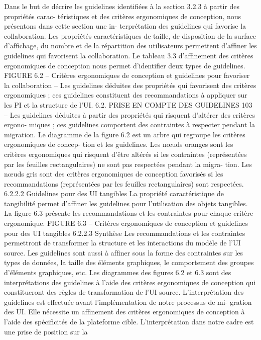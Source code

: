 \documentclass{article}
\begin{document}
Dans le but de décrire les guidelines identiﬁées à la section 3.2.3 à partir des propriétés carac-
téristiques et des critères ergonomiques de conception, nous présentons dans cette section une in-
terprétation des guidelines qui favorise la collaboration. Les propriétés caractéristiques de taille, de
disposition de la surface d’afﬁchage, du nombre et de la répartition des utilisateurs permettent d’afﬁner
les guidelines qui favorisent la collaboration. Le tableau 3.3 d’afﬁnement des critères ergonomiques
de conception nous permet d’identiﬁer deux types de guidelines.
FIGURE 6.2 – Critères ergonomiques de conception et guidelines pour favoriser la collaboration
– Les guidelines déduites des propriétés qui favorisent des critères ergonomiques ; ces guidelines
constituent des recommandations à appliquer sur les PI et la structure de l’UI.
6.2. PRISE EN COMPTE DES GUIDELINES
103
– Les guidelines déduites à partir des propriétés qui risquent d’altérer des critères ergono-
miques ; ces guidelines comportent des contraintes à respecter pendant la migration.
Le diagramme de la ﬁgure 6.2 est un arbre qui regroupe les critères ergonomiques de concep-
tion et les guidelines. Les nœuds oranges sont les critères ergonomiques qui risquent d’être altérés si
les contraintes (représentées par les feuilles rectangulaires) ne sont pas respectées pendant la migra-
tion. Les nœuds gris sont des critères ergonomiques de conception favorisés si les recommandations
(représentées par les feuilles rectangulaires) sont respectées.
6.2.2.2
Guidelines pour des UI tangibles
La propriété caractéristique de tangibilité permet d’afﬁner les guidelines pour l’utilisation des
objets tangibles. La ﬁgure 6.3 présente les recommandations et les contraintes pour chaque critère
ergonomique.
FIGURE 6.3 – Critères ergonomiques de conception et guidelines pour des UI tangibles
6.2.2.3
Synthèse
Les recommandations et les contraintes permettront de transformer la structure et les interactions
du modèle de l’UI source.
Les guidelines sont aussi à afﬁner sous la forme des contraintes sur les types de données, la taille
des éléments graphiques, le comportement des groupes d’éléments graphiques, etc.
Les diagrammes des ﬁgures 6.2 et 6.3 sont des interprétations des guidelines à l’aide des critères
ergonomiques de conception qui constitueront des règles de transformation de l’UI source.
L’interprétation des guidelines est effectuée avant l’implémentation de notre processus de mi-
gration des UI. Elle nécessite un afﬁnement des critères ergonomiques de conception à l’aide des
spéciﬁcités de la plateforme cible. L’interprétation dans notre cadre est une prise de position sur la
\end{document}
